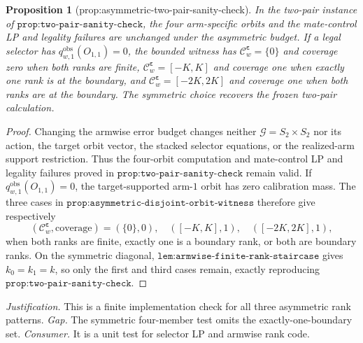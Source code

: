 \documentclass{article}
\newtheorem{proposition}{Proposition}
\begin{document}
\begin{proposition}[prop:asymmetric-two-pair-sanity-check]\label{prop:asymmetric-two-pair-sanity-check}
In the two-pair instance of \(\texttt{prop:two-pair-sanity-check}\), the four arm-specific orbits and the mate-control LP and legality failures are unchanged under the asymmetric budget. If a legal selector has \(q^{\mathrm{obs}}_{w,1}(O_{1,1})=0\), the bounded witness has \(\mathcal C^{\boldsymbol\varepsilon}_w=\{0\}\) and coverage zero when both ranks are finite, \(\mathcal C^{\boldsymbol\varepsilon}_w=[-K,K]\) and coverage one when exactly one rank is at the boundary, and \(\mathcal C^{\boldsymbol\varepsilon}_w=[-2K,2K]\) and coverage one when both ranks are at the boundary. The symmetric choice recovers the frozen two-pair calculation.
\end{proposition}
\begin{proof}
Changing the armwise error budget changes neither \(\mathcal G=S_2\times S_2\) nor its action, the target orbit vector, the stacked selector equations, or the realized-arm support restriction. Thus the four-orbit computation and mate-control LP and legality failures proved in \(\texttt{prop:two-pair-sanity-check}\) remain valid. If \(q^{\mathrm{obs}}_{w,1}(O_{1,1})=0\), the target-supported arm-\(1\) orbit has zero calibration mass. The three cases in \(\texttt{prop:asymmetric-disjoint-orbit-witness}\) therefore give respectively
\[
(\mathcal C^{\boldsymbol\varepsilon}_w,\text{coverage})
= (\{0\},0),\quad([-K,K],1),\quad([-2K,2K],1),
\]
when both ranks are finite, exactly one is a boundary rank, or both are boundary ranks. On the symmetric diagonal, \(\texttt{lem:armwise-finite-rank-staircase}\) gives \(k_0=k_1=k\), so only the first and third cases remain, exactly reproducing \(\texttt{prop:two-pair-sanity-check}\).
\end{proof}
\par\smallskip\noindent \textit{Justification.} This is a finite implementation check for all three asymmetric rank patterns. \textit{Gap.} The symmetric four-member test omits the exactly-one-boundary set. \textit{Consumer.} It is a unit test for selector LP and armwise rank code.
\end{document}
